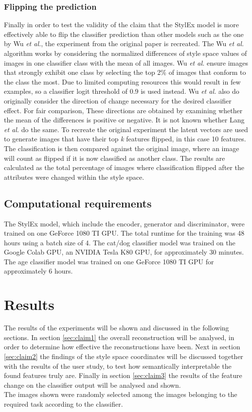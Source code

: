 \subsubsection{Flipping the prediction}
Finally in order to test the validity of the claim that the StylEx model is more effectively able to flip the classifier prediction than other models such as the one by Wu \textit{et al.}, the experiment from the original paper is recreated. The Wu \textit{et al.} algorithm works by considering the normalized differences of style space values of images in one classifier class with the mean of all images. Wu \textit{et al.} ensure images that strongly exhibit one class by selecting the top 2\% of images that conform to the class the most. Due to limited computing resources this would result in few examples, so a classifier logit threshold of 0.9 is used instead. Wu \textit{et al.} also do originally consider the direction of change necessary for the desired classifier effect. For fair comparison, These directions are obtained by examining whether the mean of the differences is positive or negative. It is not known whether Lang \textit{et al.} do the same. To recreate the original experiment the latent vectors are used to generate images that have their top \textit{k} features flipped, in this case 10 features. The classification is then compared against the original image, where an image will count as flipped if it is now classified as another class. The results are calculated as the total percentage of images where classification flipped after the attributes were changed within the style space.


\subsection{Computational requirements}
The StylEx model, which include the encoder, generator and discriminator, were trained on one GeForce 1080 TI GPU. The total runtime for the training was 48 hours using a batch size of 4. The cat/dog classifier model was trained on the Google Colab GPU, an NVIDIA Tesla K80 GPU, for approximately 30 minutes. The age classifier model was trained on one GeForce 1080 TI GPU for approximately 6 hours.


\section{Results}
\label{sec:results}
\label{sec:results}

The results of the experiments will be shown and discussed in the following sections. In section \ref{sec:claim1} the overall reconstruction will be analysed, in order to determine how effective the reconstructions have been. Next in section \ref{sec:claim2} the findings of the style space coordinates will be discussed together with the results of the user study, to test how semantically interpretable the found features truly are. Finally in section \ref{sec:claim3} the results of the feature change on the classifier output will be analysed and shown. \\
The images shown were randomly selected among the images belonging to the required task according to the classifier.
